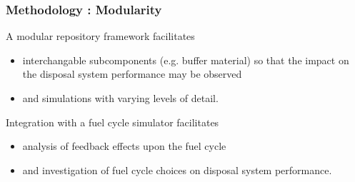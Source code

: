 
\begin{frame}[ctb!]
  \frametitle{Methodology : Modularity }
  A modular repository framework facilitates 
  \begin{itemize}
    \item  interchangable subcomponents (e.g. buffer material) so that 
      the impact on the disposal system performance may be observed
    \item and simulations with varying levels of detail.
  \end{itemize}
 \pause
  Integration with a fuel cycle simulator facilitates
  \begin{itemize}
    \item analysis of feedback effects upon the fuel cycle
    \item and investigation of fuel cycle choices on disposal system 
      performance.
  \end{itemize}
\end{frame}

